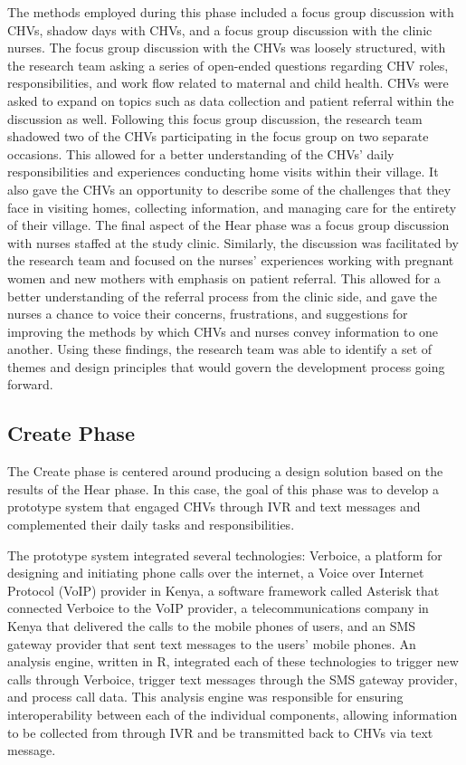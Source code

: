 The methods employed during this phase included a focus group discussion with CHVs, shadow days with CHVs, and a focus group discussion with the clinic nurses. The focus group discussion with the CHVs was loosely structured, with the research team asking a series of open-ended questions regarding CHV roles, responsibilities, and work flow related to maternal and child health. CHVs were asked to expand on topics such as data collection and patient referral within the discussion as well. Following this focus group discussion, the research team shadowed two of the CHVs participating in the focus group on two separate occasions. This allowed for a better understanding of the CHVs' daily responsibilities and experiences conducting home visits within their village. It also gave the CHVs an opportunity to describe some of the challenges that they face in visiting homes, collecting information, and managing care for the entirety of their village. The final aspect of the Hear phase was a focus group discussion with nurses staffed at the study clinic. Similarly, the discussion was facilitated by the research team and focused on the nurses' experiences working with pregnant women and new mothers with emphasis on patient referral. This allowed for a better understanding of the referral process from the clinic side, and gave the nurses a chance to voice their concerns, frustrations, and suggestions for improving the methods by which CHVs and nurses convey information to one another. Using these findings, the research team was able to identify a set of themes and design principles that would govern the development process going forward. 

\subsection{Create Phase}
The Create phase is centered around producing a design solution based on the results of the Hear phase. In this case, the goal of this phase was to develop a prototype system that engaged CHVs through IVR and text messages and complemented their daily tasks and responsibilities. 

The prototype system integrated several technologies: Verboice, a platform for designing and initiating phone calls over the internet, a Voice over Internet Protocol (VoIP) provider in Kenya, a software framework called Asterisk that connected Verboice to the VoIP provider, a telecommunications company in Kenya that delivered the calls to the mobile phones of users, and an SMS gateway provider that sent text messages to the users' mobile phones. An analysis engine, written in R, integrated each of these technologies to trigger new calls through Verboice, trigger text messages through the SMS gateway provider, and process call data. This analysis engine was responsible for ensuring interoperability between each of the individual components, allowing information to be collected from through IVR and be transmitted back to CHVs via text message. 

